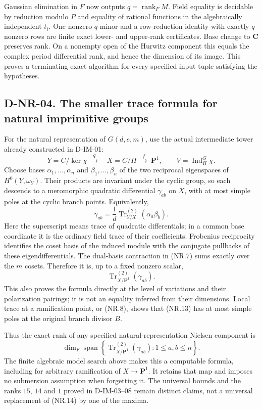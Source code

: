 Gaussian elimination in $F$ now outputs $q=\operatorname{rank}_F M$.
Field equality is decidable by reduction modulo $P$ and equality of
rational functions in the algebraically independent $t_i$.
One nonzero $q$-minor and a row-reduction identity with exactly $q$
nonzero rows are finite exact lower- and upper-rank certificates.
Base change to $\mathbf C$ preserves rank.  On a nonempty open of the
Hurwitz component this equals the complex period differential rank,
and hence the dimension of its image.  This proves a terminating exact
algorithm for every specified input tuple satisfying the hypotheses.

\subsection*{D-NR-04. The smaller trace formula for natural imprimitive groups}

For the natural representation of $G(d,e,m)$, use the actual intermediate
tower already constructed in D-IM-01:
\[
             Y=C/\ker\chi\ \xrightarrow{\ q\ }\quad
             X=C/H\ \xrightarrow{\ f\ }\ \mathbf P^1,
 \qquad V=\operatorname{Ind}_H^G\chi.                         \tag{NR.11}
\]
Choose bases $\alpha_1,\ldots,\alpha_n$ and
$\beta_1,\ldots,\beta_n$ of the two reciprocal eigenspaces of
$H^0(Y,\omega_Y)$.  Their products are invariant under the cyclic group,
so each descends to a meromorphic quadratic differential
$\gamma_{ab}$ on $X$, with at most simple poles at the cyclic branch
points.  Equivalently,
\[
 \gamma_{ab}=\frac1d\operatorname{Tr}^{(2)}_{Y/X}
                          (\alpha_a\beta_b).                \tag{NR.12}
\]
Here the superscript means trace of quadratic differentials; in a common
base coordinate it is the ordinary field trace of their coefficients.
Frobenius reciprocity identifies the coset basis of the induced module
with the conjugate pullbacks of these eigendifferentials.  The dual-basis
contraction in (NR.7) sums exactly over the $m$ cosets.  Therefore it is,
up to a fixed nonzero scalar,
\[
                     \operatorname{Tr}^{(2)}_{X/\mathbf P^1}
                                      (\gamma_{ab}).         \tag{NR.13}
\]
This also proves the formula directly at the level of variations and
their polarization pairings; it is not an equality inferred from their
dimensions.  Local trace at a ramification point, or (NR.8), shows that
(NR.13) has at most simple poles at the original branch divisor $B$.

Thus the exact rank of any specified natural-representation Nielsen
component is
\[
 \boxed{\dim_F\operatorname{span}\left\{
       \operatorname{Tr}^{(2)}_{X/\mathbf P^1}(\gamma_{ab}):
                       1\le a,b\le n\right\}.}              \tag{NR.14}
\]
The finite algebraic model search above makes this a computable formula,
including for arbitrary ramification of $X\to\mathbf P^1$.
It retains that map and imposes no submersion assumption when forgetting
it.  The universal bounds and the ranks $15$, $14$ and $1$ proved in
D-IM-03--08 remain distinct claims, not a universal replacement of
(NR.14) by one of the maxima.

